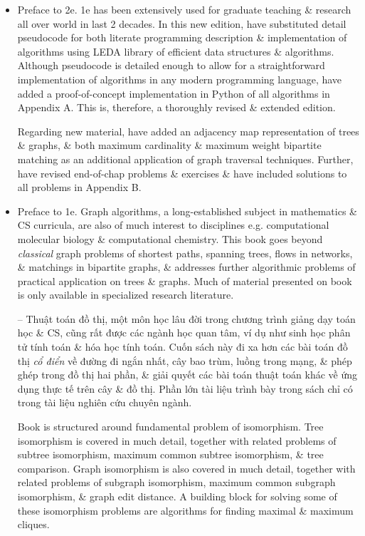 \documentclass{article}
\begin{document}
\begin{itemize}
	\item {\sf Preface to 2e.} 1e has been extensively used for graduate teaching \& research all over world in last 2 decades. In this new edition, have substituted detail pseudocode for both literate programming description \& implementation of algorithms using LEDA library of efficient data structures \& algorithms. Although pseudocode is detailed enough to allow for a straightforward implementation of algorithms in any modern programming language, have added a proof-of-concept implementation in Python of all algorithms in Appendix A. This is, therefore, a thoroughly revised \& extended edition.
	
	Regarding new material, have added an adjacency map representation of trees \& graphs, \& both maximum cardinality \& maximum weight bipartite matching as an additional application of graph traversal techniques. Further, have revised end-of-chap problems \& exercises \& have included solutions to all problems in Appendix B.
	\item {\sf Preface to 1e.} Graph algorithms, a long-established subject in mathematics \& CS curricula, are also of much interest to disciplines e.g. computational molecular biology \& computational chemistry. This book goes beyond {\it classical} graph problems of shortest paths, spanning trees, flows in networks, \& matchings in bipartite graphs, \& addresses further algorithmic problems of practical application on trees \& graphs. Much of material presented on book is only available in specialized research literature.
	
	-- Thuật toán đồ thị, một môn học lâu đời trong chương trình giảng dạy toán học \& CS, cũng rất được các ngành học quan tâm, ví dụ như sinh học phân tử tính toán \& hóa học tính toán. Cuốn sách này đi xa hơn các bài toán đồ thị {\it cổ điển} về đường đi ngắn nhất, cây bao trùm, luồng trong mạng, \& phép ghép trong đồ thị hai phần, \& giải quyết các bài toán thuật toán khác về ứng dụng thực tế trên cây \& đồ thị. Phần lớn tài liệu trình bày trong sách chỉ có trong tài liệu nghiên cứu chuyên ngành.
	
	Book is structured around fundamental problem of isomorphism. Tree isomorphism is covered in much detail, together with related problems of subtree isomorphism, maximum common subtree isomorphism, \& tree comparison. Graph isomorphism is also covered in much detail, together with related problems of subgraph isomorphism, maximum common subgraph isomorphism, \& graph edit distance. A building block for solving some of these isomorphism problems are algorithms for finding maximal \& maximum cliques.
	

\end{itemize}
\end{document}
